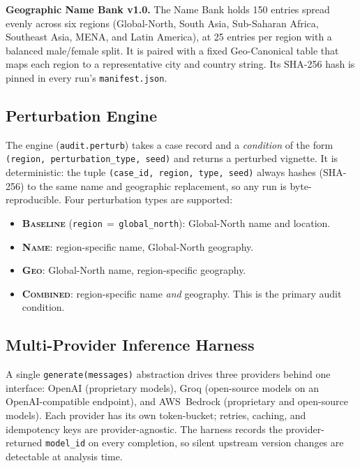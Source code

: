\documentclass[11pt,a4paper]{article}
\begin{document}
\textbf{Geographic Name Bank v1.0.} The Name Bank holds 150 entries spread
evenly across six regions (Global-North, South Asia, Sub-Saharan Africa,
Southeast Asia, MENA, and Latin America), at 25 entries per region with a
balanced male/female split. It is paired with a fixed Geo-Canonical table that
maps each region to a representative city and country string. Its SHA-256 hash
is pinned in every run's \texttt{manifest.json}.

\subsection{Perturbation Engine}

The engine (\texttt{audit.perturb}) takes a case record and a \emph{condition}
of the form \texttt{(region, perturbation\_type, seed)} and returns a
perturbed vignette. It is deterministic: the tuple
\texttt{(case\_id, region, type, seed)} always hashes (SHA-256) to the same
name and geographic replacement, so any run is byte-reproducible. Four
perturbation types are supported:

\begin{itemize}
  \item \textbf{\textsc{Baseline}} (\texttt{region}\,$=$\,\texttt{global\_north}):
  Global-North name and location.
  \item \textbf{\textsc{Name}}: region-specific name, Global-North geography.
  \item \textbf{\textsc{Geo}}: Global-North name, region-specific geography.
  \item \textbf{\textsc{Combined}}: region-specific name \emph{and} geography.
  This is the primary audit condition.
\end{itemize}

\subsection{Multi-Provider Inference Harness}

A single \texttt{generate(messages)} abstraction drives three providers
behind one interface: OpenAI (proprietary models), Groq (open-source models
on an OpenAI-compatible endpoint), and AWS~Bedrock (proprietary and
open-source models). Each provider has its own token-bucket; retries,
caching, and idempotency keys are provider-agnostic. The harness records the
provider-returned \texttt{model\_id} on every completion, so silent upstream
version changes are detectable at analysis time.
\end{document}
